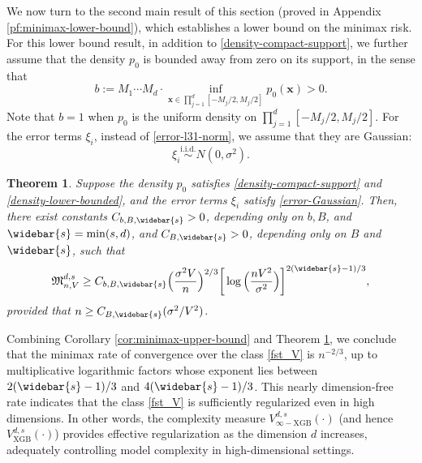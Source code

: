\documentclass[10pt]{article}
\newtheorem{theorem}{Theorem}
\newcommand{\vxgb}{{V^{d, s}_{\text{XGB}}}}
\newcommand{\vinfxgb}{{V^{d, s}_{\infty-\text{XGB}}}}
\newcommand{\minimax}{{\mathfrak{M}^{d, s}_{n, V}}}
\newcommand{\xbf}{{\mathbf{x}}}
\begin{document}
We now turn to the second main result of this section
(proved in Appendix \ref{pf:minimax-lower-bound}), 
which establishes a lower bound on the minimax risk. For this lower 
bound result, in addition to \eqref{density-compact-support}, we
further assume that the density $p_0$ is bounded away from zero 
on its support, in the sense that
\begin{equation}\label{density-lower-bounded}
    b := M_1 \cdots M_d \cdot 
    \inf_{\xbf \in \prod_{j = 1}^{d} [-M_j/2, M_j/2]} 
    p_0(\xbf) > 0.
\end{equation}
Note that $b = 1$ when $p_0$ is the uniform density on 
$\prod_{j = 1}^{d} [-M_j/2, M_j/2]$. 
For the error terms $\xi_i$, instead of \eqref{error-l31-norm}, 
we assume that they are Gaussian:
\begin{equation}\label{error-Gaussian}
    \xi_i \overset{\text{i.i.d.}}{\sim} N(0, \sigma^2).
\end{equation}

\begin{theorem}\label{thm:minimax-lower-bound}
    Suppose the density $p_0$ satisfies
    \eqref{density-compact-support} and \eqref{density-lower-bounded}, 
    and the error terms $\xi_i$ satisfy \eqref{error-Gaussian}. 
    Then, there exist constants $C_{b, B, \widebar{s}} > 0$, 
    depending only on $b, B$, and $\widebar{s} = \min(s, d)$, and 
    $C_{B, \widebar{s}} > 0$, depending only on $B$ and $\widebar{s}$, 
    such that
    \begin{equation*}
        \minimax \ge C_{b, B, \widebar{s}} 
        \Big(\frac{\sigma^2 V}{n}\Big)^{2/3} 
        \bigg[\log \Big(\frac{n V^2}{\sigma^2}\Big)
        \bigg]^{2(\widebar{s} - 1)/3},
    \end{equation*}
    provided that $n \ge C_{B, \widebar{s}} (\sigma^2/ V^2)$.
\end{theorem}

Combining Corollary \ref{cor:minimax-upper-bound} and 
Theorem \ref{thm:minimax-lower-bound}, we conclude that the minimax 
rate of convergence over the class \eqref{fst_V} is $n^{-2/3}$, up 
to multiplicative logarithmic factors whose exponent lies between 
$2(\widebar{s} - 1)/3$ and $4(\widebar{s} - 1)/3$. This 
nearly dimension-free rate indicates that the class 
\eqref{fst_V} is sufficiently regularized even in high dimensions. 
In other words, the complexity measure $\vinfxgb(\cdot)$ (and hence 
$\vxgb(\cdot)$) provides effective regularization as the dimension 
$d$ increases, adequately controlling model complexity in 
high-dimensional settings. 
\end{document}
